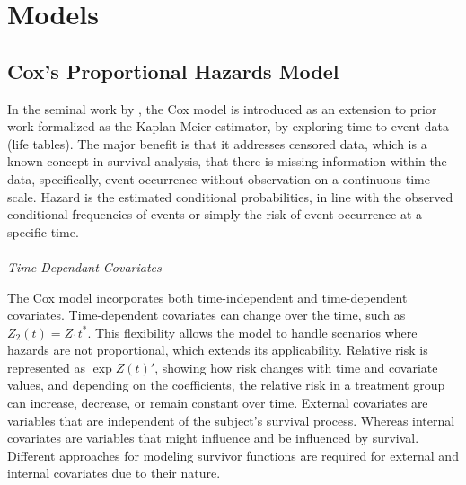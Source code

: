 \section{Models}
\subsection{Cox's Proportional Hazards Model}

\noindent In the seminal work by \parencite{cox_regression_1972}, the Cox model is introduced as an extension to prior work formalized as the Kaplan-Meier estimator, by exploring time-to-event data (life tables). The major benefit is that it addresses censored data, which is a known concept in survival analysis, that there is missing information within the data, specifically, event occurrence without observation on a continuous time scale. Hazard is the estimated conditional probabilities, in line with the observed conditional frequencies of events or simply the risk of event occurrence at a specific time.
\\\\
\textit{Time-Dependant Covariates}
\par \noindent The Cox model incorporates both time-independent and time-dependent covariates. \parencite{kalbfleisch_fifty_2023} Time-dependent covariates can change over the time, such as \(Z_{2}(t) = Z_{1}t^{*}\). This flexibility allows the model to handle scenarios where hazards are not proportional, which extends its applicability. Relative risk is represented as \(\exp{Z(t)'}\), showing how risk changes with time and covariate values, and depending on the coefficients, the relative risk in a treatment group can increase, decrease, or remain constant over time. \parencite{kalbfleisch_fifty_2023} External covariates are variables that are independent of the subject's survival process. Whereas internal covariates are variables that might influence and be influenced by survival. \parencite{kalbfleisch_fifty_2023} Different approaches for modeling survivor functions are required for external and internal covariates due to their nature.
\\\\
